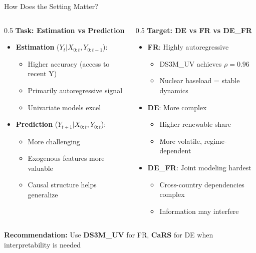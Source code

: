 \documentclass[aspectratio=169]{beamer}
\begin{document}
\begin{frame}{How Does the Setting Matter?}
\begin{columns}
\begin{column}{0.5\textwidth}
\textbf{Task: Estimation vs Prediction}
\begin{itemize}
    \item \textbf{Estimation} ($Y_t | X_{0:t}, Y_{0:t-1}$):
    \begin{itemize}
        \item Higher accuracy (access to recent Y)
        \item Primarily autoregressive signal
        \item Univariate models excel
    \end{itemize}
    \item \textbf{Prediction} ($Y_{t+1} | X_{0:t}, Y_{0:t}$):
    \begin{itemize}
        \item More challenging
        \item Exogenous features more valuable
        \item Causal structure helps generalize
    \end{itemize}
\end{itemize}
\end{column}

\begin{column}{0.5\textwidth}
\textbf{Target: DE vs FR vs DE\_FR}
\begin{itemize}
    \item \textbf{FR}: Highly autoregressive
    \begin{itemize}
        \item DS3M\_UV achieves $\rho = 0.96$
        \item Nuclear baseload = stable dynamics
    \end{itemize}
    \item \textbf{DE}: More complex
    \begin{itemize}
        \item Higher renewable share
        \item More volatile, regime-dependent
    \end{itemize}
    \item \textbf{DE\_FR}: Joint modeling hardest
    \begin{itemize}
        \item Cross-country dependencies complex
        \item Information may interfere
    \end{itemize}
\end{itemize}
\end{column}
\end{columns}

\vspace{0.3cm}
\begin{center}
\textbf{Recommendation:} Use \textbf{DS3M\_UV} for FR, \textbf{CaRS} for DE when interpretability is needed
\end{center}
\end{frame}
\end{document}
